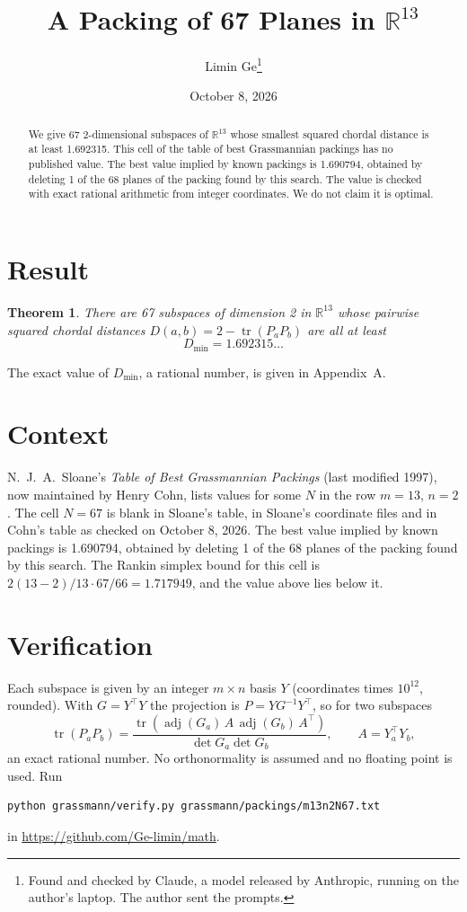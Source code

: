 \documentclass[11pt,a4paper]{article}
\title{A Packing of 67 Planes in $\mathbb{R}^{13}$}
\author{Limin Ge\thanks{Found and checked by Claude, a model released by Anthropic, running on the author's laptop. The author sent the prompts.}}
\date{October 8, 2026}
\newtheorem*{theorem}{Theorem}
\begin{document}
\maketitle
\begin{abstract}
We give 67 2-dimensional subspaces of $\mathbb{R}^{13}$ whose smallest squared chordal distance is at least 1.692315. This cell of the table of best Grassmannian packings has no published value. The best value implied by known packings is 1.690794, obtained by deleting 1 of the 68 planes of the packing found by this search. The value is checked with exact rational arithmetic from integer coordinates. We do not claim it is optimal.
\end{abstract}

\section{Result}
\begin{theorem}
There are 67 subspaces of dimension 2 in $\mathbb{R}^{13}$ whose pairwise squared chordal distances $D(a,b) = 2 - \operatorname{tr}(P_aP_b)$ are all at least
\[ D_{\min} = 1.692315\ldots \]
\end{theorem}
The exact value of $D_{\min}$, a rational number, is given in Appendix~A.


\section{Context}
N.~J.~A.~Sloane's \emph{Table of Best Grassmannian Packings} (last modified 1997), now maintained by Henry Cohn, lists values for some $N$ in the row $m=13$, $n=2$. The cell $N=67$ is blank in Sloane's table, in Sloane's coordinate files and in Cohn's table as checked on October 8, 2026. The best value implied by known packings is 1.690794, obtained by deleting 1 of the 68 planes of the packing found by this search. The Rankin simplex bound for this cell is $2(13-2)/13\cdot 67/66 = 1.717949$, and the value above lies below it.


\section{Verification}
Each subspace is given by an integer $m\times n$ basis $Y$ (coordinates times $10^{12}$, rounded). With $G=Y^\top Y$ the projection is $P=YG^{-1}Y^\top$, so for two subspaces
\[ \operatorname{tr}(P_aP_b)=\frac{\operatorname{tr}(\operatorname{adj}(G_a)\,A\,\operatorname{adj}(G_b)\,A^\top)}{\det G_a\det G_b},\qquad A=Y_a^\top Y_b, \]
an exact rational number. No orthonormality is assumed and no floating point is used. Run
\begin{verbatim}
python grassmann/verify.py grassmann/packings/m13n2N67.txt
\end{verbatim}
in \url{https://github.com/Ge-limin/math}.
\end{document}
